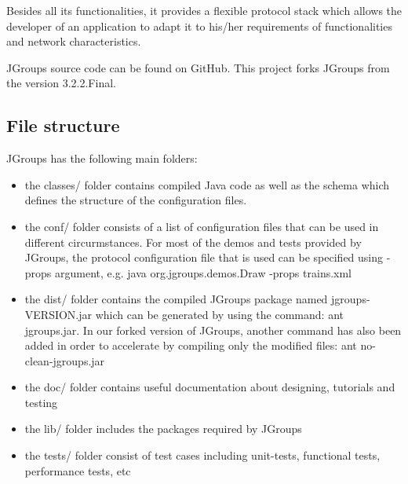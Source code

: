 \documentclass[a4paper,10pt]{report}
\begin{document}
Besides all its functionalities, it provides a flexible protocol stack which allows the developer of an application to adapt it to his/her requirements of functionalities and network characteristics\cite{jgroups}.

JGroups source code can be found on GitHub. This project forks JGroups from the version 3.2.2.Final.

\subsection{File structure}
JGroups has the following main folders:
\begin{itemize}
\item the classes/ folder contains compiled Java code as well as the schema which defines the structure of the configuration files.
\item the conf/ folder consists of a list of configuration files that can be used in different circurmstances. For most of the demos and tests provided by JGroups, the protocol configuration file that is used can be specified using -props argument, e.g. 
java org.jgroups.demos.Draw -props trains.xml
\item the dist/ folder contains the compiled JGroups package named jgroups-VERSION.jar which can be generated by using the command: ant jgroups.jar. In our forked version of JGroups, another command has also been added in order to accelerate by compiling only the modified files: ant no-clean-jgroups.jar
\item the doc/ folder contains useful documentation about designing, tutorials and testing
\item the lib/ folder includes the packages required by JGroups
\item the tests/ folder consist of test cases including unit-tests, functional tests, performance tests, etc
\end{itemize}
\end{document}
